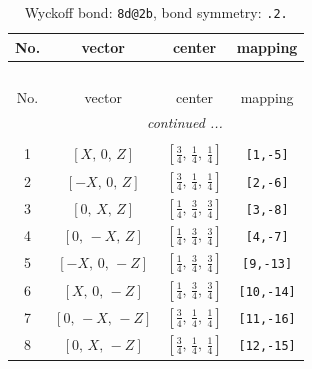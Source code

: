 \documentclass[fleqn,8pt]{jsarticle}
\begin{document}
\renewcommand{\arraystretch}{1.2}
\begin{longtable}{cccc}
\caption{Wyckoff bond: {\tt 8d@2b}, bond symmetry: {\tt .2.}}
 \\
 \hline \hline
No. & vector & center & mapping \\ \hline \endfirsthead

\multicolumn{3}{l}{\tablename\ \thetable{}} \\
 \hline \hline
No. & vector & center & mapping \\ \hline \endhead

 \hline \hline
\multicolumn{3}{r}{\footnotesize\it continued ...} \\ \endfoot

 \hline \hline
\multicolumn{3}{r}{} \\ \endlastfoot

1 & $\left[ X,\, 0,\, Z \right]$ & $\left[ \frac{3}{4},\, \frac{1}{4},\, \frac{1}{4} \right]$ & {\tt [1,-5]} \\ \hline
2 & $\left[ - X,\, 0,\, Z \right]$ & $\left[ \frac{3}{4},\, \frac{1}{4},\, \frac{1}{4} \right]$ & {\tt [2,-6]} \\ \hline
3 & $\left[ 0,\, X,\, Z \right]$ & $\left[ \frac{1}{4},\, \frac{3}{4},\, \frac{3}{4} \right]$ & {\tt [3,-8]} \\ \hline
4 & $\left[ 0,\, - X,\, Z \right]$ & $\left[ \frac{1}{4},\, \frac{3}{4},\, \frac{3}{4} \right]$ & {\tt [4,-7]} \\ \hline
5 & $\left[ - X,\, 0,\, - Z \right]$ & $\left[ \frac{1}{4},\, \frac{3}{4},\, \frac{3}{4} \right]$ & {\tt [9,-13]} \\ \hline
6 & $\left[ X,\, 0,\, - Z \right]$ & $\left[ \frac{1}{4},\, \frac{3}{4},\, \frac{3}{4} \right]$ & {\tt [10,-14]} \\ \hline
7 & $\left[ 0,\, - X,\, - Z \right]$ & $\left[ \frac{3}{4},\, \frac{1}{4},\, \frac{1}{4} \right]$ & {\tt [11,-16]} \\ \hline
8 & $\left[ 0,\, X,\, - Z \right]$ & $\left[ \frac{3}{4},\, \frac{1}{4},\, \frac{1}{4} \right]$ & {\tt [12,-15]} \\
\end{longtable}
\renewcommand{\arraystretch}{1.2}
\end{document}
